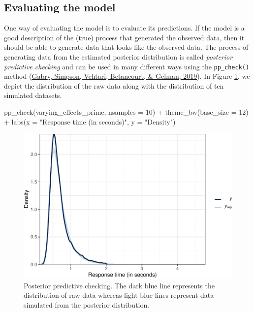 \documentclass[
  11pt,
  english,
  ,doc,floatsintext]{apa6}
\newenvironment{Shaded}{}{}
\newcommand{\AttributeTok}[1]{\textcolor[rgb]{0.49,0.56,0.16}{#1}}
\newcommand{\DecValTok}[1]{\textcolor[rgb]{0.25,0.63,0.44}{#1}}
\newcommand{\FunctionTok}[1]{\textcolor[rgb]{0.02,0.16,0.49}{#1}}
\newcommand{\NormalTok}[1]{#1}
\newcommand{\SpecialCharTok}[1]{\textcolor[rgb]{0.25,0.44,0.63}{#1}}
\newcommand{\StringTok}[1]{\textcolor[rgb]{0.25,0.44,0.63}{#1}}
\begin{document}
\newpage

\hypertarget{evaluating-the-model}{%
\subsection{Evaluating the model}\label{evaluating-the-model}}

One way of evaluating the model is to evaluate its predictions. If the model is a good description of the (true) process that generated the observed data, then it should be able to generate data that looks like the observed data. The process of generating data from the estimated posterior distribution is called \emph{posterior predictive checking} and can be used in many different ways using the \texttt{pp\_check()} method (\protect\hyperlink{ref-gabry_visualization_2019}{Gabry, Simpson, Vehtari, Betancourt, \& Gelman, 2019}). In Figure \ref{fig:ppc}, we depict the distribution of the raw data along with the distribution of ten simulated datasets.

\begin{Shaded}
\begin{Highlighting}[]
\FunctionTok{pp\_check}\NormalTok{(varying\_effects\_prime, }\AttributeTok{nsamples =} \DecValTok{10}\NormalTok{) }\SpecialCharTok{+}
  \FunctionTok{theme\_bw}\NormalTok{(}\AttributeTok{base\_size =} \DecValTok{12}\NormalTok{) }\SpecialCharTok{+}
  \FunctionTok{labs}\NormalTok{(}\AttributeTok{x =} \StringTok{"Response time (in seconds)"}\NormalTok{, }\AttributeTok{y =} \StringTok{"Density"}\NormalTok{)}
\end{Highlighting}
\end{Shaded}

\begin{figure}[!htb]

{\centering \includegraphics[width=0.75\linewidth]{supplementary_materials_files/figure-latex/ppc-1} 

}

\caption{Posterior predictive checking. The dark blue line represents the distribution of raw data whereas light blue lines represent data simulated from the posterior distribution.}\label{fig:ppc}
\end{figure}
\end{document}
